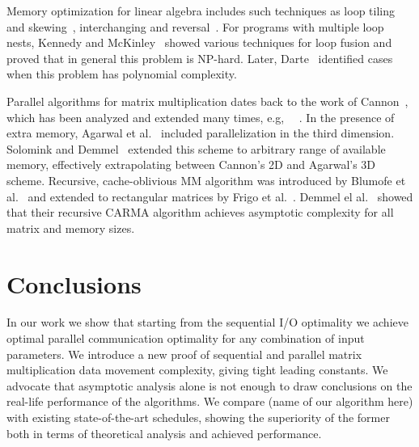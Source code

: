 \documentclass[sigplan,review,anonymous]{acmart}\settopmatter{printfolios=true,printccs=false,printacmref=false}
\newcommand\greg[1]{\textcolor{blue}{[Greg: #1]}}
\begin{document}
Memory optimization for linear algebra includes such techniques as loop tiling 
and skewing~\cite{tiling}, interchanging and reversal~\cite{tiling2}. For 
programs with multiple loop nests, Kennedy and McKinley~\cite{loopFusion} 
showed various techniques for loop fusion and proved that in general this 
problem is NP-hard. Later, 
Darte~\cite{loopFusionComplexity} identified cases when this problem has 
polynomial complexity.

Parallel algorithms for matrix multiplication dates back to the work of 
Cannon~\cite{Cannon}, which has been analyzed and extended many times, e.g, 
~\cite{MManalysis}~\cite{generalCannon}. In the presence of extra memory, 
Agarwal et al.~\cite{summa3d} included parallelization in the third dimension. 
Solomink and Demmel~\cite{25d} extended this scheme to arbitrary range of 
available memory, effectively extrapolating between Cannon's 2D and Agarwal's 
3D scheme. Recursive, cache-oblivious MM algorithm was introduced by Blumofe 
et al.~\cite{recursiveMM} and extended to rectangular matrices by Frigo et 
al.~\cite{recursiveRectangularMM}. Demmel el al.~\cite{CARMA} showed that their 
recursive CARMA algorithm achieves asymptotic complexity for all matrix and 
memory sizes. 

\section{Conclusions}
In our work we show that starting from the sequential I/O optimality we achieve 
optimal parallel communication optimality for any combination of input 
parameters. We introduce a new proof of sequential and parallel matrix 
multiplication data movement complexity, giving tight leading constants. We 
advocate that asymptotic analysis alone is not enough to draw conclusions on 
the real-life performance of the algorithms. We 
compare (name of our algorithm here) with existing state-of-the-art schedules, 
showing the 
superiority of the former both in terms of theoretical analysis and achieved 
performance.

%

%


\end{document}
